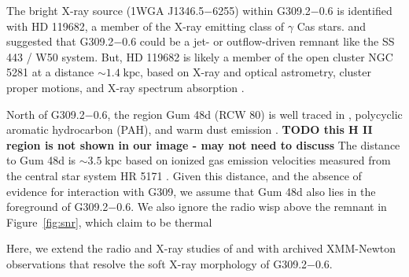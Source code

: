 \documentclass[twocolumn,tighten,trackchanges]{aastex61}
\newcommand*{\mt}{\mathrm}
\newcommand*{\unit}[1]{\;\mt{#1}}  %
\newcommand*{\abt}{\mathord{\sim}} %
\newcommand*{\nH}{N_{\mathrm{H}}}
\newcommand*{\Gsnr}{G309.2$-$0.6}
\begin{document}
The bright X-ray source (1WGA J1346.5$-$6255) within \Gsnr{} is identified with
HD 119682, a member of the X-ray emitting class of $\gamma$ Cas stars.  %
 and  suggested that
\Gsnr{} could be a jet- or outflow-driven remnant like the SS 443 / W50 system.
But, HD 119682 is likely a member of the open cluster NGC 5281 at a distance
$\abt 1.4 \unit{kpc}$, based on X-ray and optical astrometry, cluster proper
motions, and X-ray spectrum absorption \citep{rakowski2006-star, safi-harb2007,
torrejon2013}.

North of \Gsnr{}, the  region Gum 48d (RCW 80) is well traced in
, polycyclic aromatic hydrocarbon (PAH), and warm dust emission
\citep{karr2009}.
\textbf{TODO this H II region is not shown in our image - may not need to
discuss}
The distance to Gum 48d is $\abt 3.5\unit{kpc}$ based on ionized gas emission
velocities measured from the central star system HR 5171 \citep{karr2009}.
Given this distance, and the absence of evidence for interaction with G309,
we assume that Gum 48d also lies in the foreground of \Gsnr{}.
We also ignore the radio wisp above the remnant in Figure~\ref{fig:snr},
which \citet{whiteoak1996} claim to be thermal





Here, we extend the radio and X-ray studies of  and
 with archived XMM-Newton observations that resolve
the soft X-ray morphology of \Gsnr{}.
\end{document}
